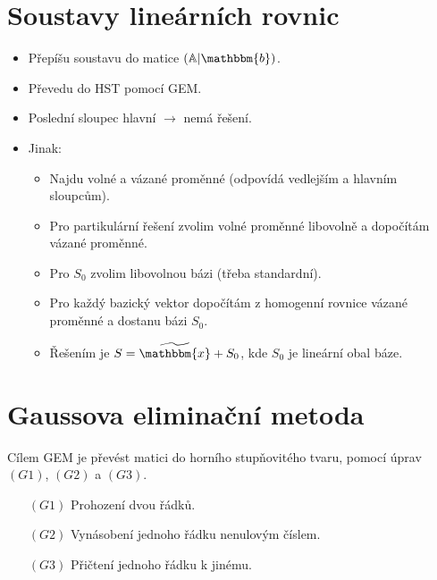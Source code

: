 \documentclass{szzclass}
\begin{document}
\section{Soustavy lineárních rovnic}
\begin{itemize}
\item Přepíšu soustavu do matice $(\mathbb{A}|\mathbbm{b})$.
\item Převedu do HST pomocí GEM.
\item Poslední sloupec hlavní $\rightarrow$ nemá řešení.
\item Jinak:
  \begin{itemize}
  \item Najdu volné a vázané proměnné (odpovídá vedlejším a hlavním sloupcům).
  \item Pro partikulární řešení zvolim volné proměnné libovolně a dopočítám vázané proměnné.
  \item Pro $S_0$ zvolim libovolnou bázi (třeba standardní).
  \item Pro každý bazický vektor dopočítám z homogenní rovnice vázané proměnné a dostanu bázi $S_0$.
  \item Řešením je $S=\widetilde{\mathbbm{x}}+S_0$, kde $S_0$ je lineární obal báze.
  \end{itemize}
\end{itemize}

\section{Gaussova eliminační metoda}
Cílem GEM je převést matici do horního stupňovitého tvaru, pomocí úprav $(G1)$, $(G2)$ a $(G3)$.

\begin{itemize}
\item[$(G1)$] Prohození dvou řádků.
\item[$(G2)$] Vynásobení jednoho řádku nenulovým číslem.
\item[$(G3)$] Přičtení jednoho řádku k jinému.
\end{itemize}
\end{document}
